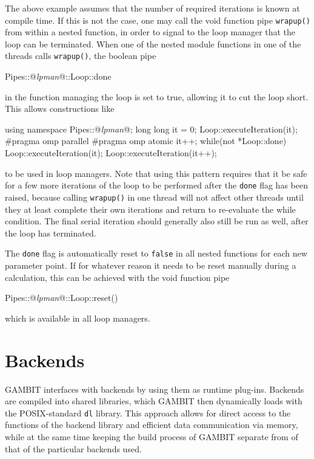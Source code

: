 \documentclass[pdftex,twocolumn,epjc3_preprint,runningheads]{svjour3}
\renewcommand{\_}{\discretionary{\underscore}{}{\underscore}}
\newcommand\term[1]{{\lstset{style=terminal}\lstinline!#1!\lstset{style=cpp}}}
\newcommand{\metavarf}[1]{\textit{\color{darkgreen}\footnotesize\textrm{#1}}}
\newcommand{\metavar}{\metavarf}
\newcommand{\gambit}{\textsf{GAMBIT}\xspace}
\newcommand{\GB}{\gambit}
\newcommand{\posix}{\textsf{POSIX}\xspace}
\begin{document}
The above example assumes that the number of required iterations is known at compile time.  If this is not the case, one may call the void function pipe \lstinline{wrapup()} from within a nested function, in order to signal to the loop manager that the loop can be terminated.  When one of the nested module functions in one of the threads calls \mbox{\lstinline{wrapup()},} the boolean pipe
\begin{lstcpp}
Pipes::@\metavar{lpman}@::Loop::done
\end{lstcpp}
in the function managing the loop is set to true, allowing it to cut the loop short.  This allows constructions like
\begin{lstcpp}
using namespace Pipes::@\metavar{lpman}@;
long long it = 0;
Loop::executeIteration(it);
#pragma omp parallel
{
  #pragma omp atomic
  it++;
  while(not *Loop::done)
  {
    Loop::executeIteration(it);
  }
}
Loop::executeIteration(it++);
\end{lstcpp}
to be used in loop managers.  Note that using this pattern requires that it be safe for a few more iterations of the loop to be performed after the \lstinline{done} flag has been raised, because calling \lstinline{wrapup()} in one thread will not affect other threads until they at least complete their own iterations and return to re-evaluate the while condition.  The final serial iteration should generally also still be run as well, after the loop has terminated.

The \lstinline{done} flag is automatically reset to \lstinline{false} in all nested functions for each new parameter point.  If for whatever reason it needs to be reset manually during a calculation, this can be achieved with the void function pipe
\begin{lstcpp}
Pipes::@\metavar{lpman}@::Loop::reset()
\end{lstcpp}
which is available in all loop managers.


\section{Backends}
\label{backends}

\GB interfaces with backends by using them as runtime plug-ins. Backends are compiled into shared libraries, which \GB then dynamically loads with the \posix-standard \term{dl} library. This approach allows for direct access to the functions of the backend library and efficient data communication via memory, while at the same time keeping the build process of \GB separate from of that of the particular backends used.
\end{document}
